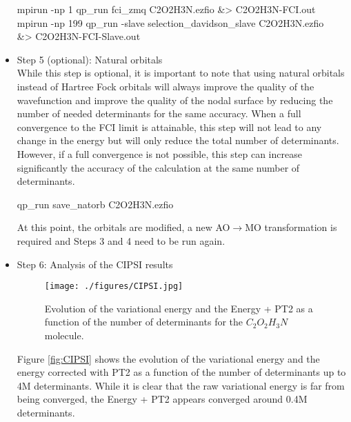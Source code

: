 \begin{itemize}
\begin{shade}
mpirun -np 1 qp_run fci_zmq C2O2H3N.ezfio &> C2O2H3N-FCI.out 
mpirun -np 199 qp_run -slave selection_davidson_slave C2O2H3N.ezfio\\
&> C2O2H3N-FCI-Slave.out 
\end{shade}

\item Step 5 (optional): Natural orbitals \\
While this step is optional, it is important to note that using natural orbitals instead of Hartree Fock orbitals will always improve the quality of the wavefunction and improve the quality of the nodal surface by reducing the number of needed determinants for the same accuracy. When a full convergence to the FCI limit is attainable, this step will not lead to any change in the energy but will only reduce the total number of determinants. However, if a full convergence is not possible, this step can increase significantly the accuracy of the calculation at the same number of determinants. \\

\begin{shade}
qp_run save_natorb C2O2H3N.ezfio  
\end{shade}
\hfill

At this point, the orbitals are modified, a new AO$\rightarrow$MO transformation is required and Steps 3 and 4 need to be run again.\\

\item Step 6: Analysis of the CIPSI results\\
\begin{figure}
\begin{center}
\texttt{[image: ./figures/CIPSI.jpg]}
\end{center}
\caption{Evolution of the variational energy and the Energy + PT2 as a function of the number of determinants for the $C_2O_2H_3N$ molecule.}
\protect{\label{fig:CIPSI}}
\end{figure}
Figure \ref{fig:CIPSI} shows the evolution of the variational energy and the energy corrected with PT2 as a function of the number of determinants up to 4M determinants. While it is clear that the raw variational energy is far from being converged, the Energy + PT2 appears converged around 0.4M determinants.\\




\end{itemize}
